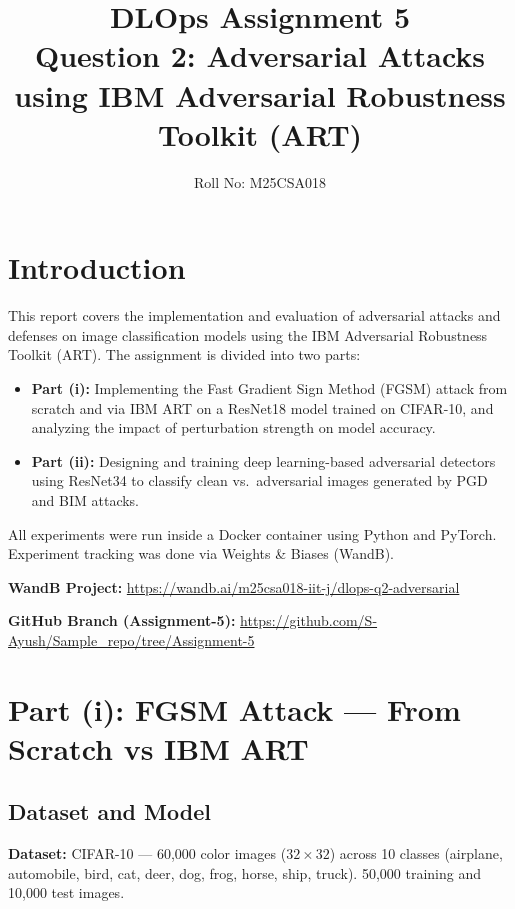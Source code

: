 \documentclass[12pt,a4paper]{article}
\title{
    \Large \textbf{DLOps Assignment 5} \\[0.5em]
    \large Question 2: Adversarial Attacks using IBM Adversarial Robustness Toolkit (ART)
}
\author{Roll No: M25CSA018}
\date{}
\begin{document}
\maketitle

\tableofcontents
\newpage

\section{Introduction}

This report covers the implementation and evaluation of adversarial attacks and
defenses on image classification models using the IBM Adversarial Robustness
Toolkit (ART). The assignment is divided into two parts:

\begin{itemize}
    \item \textbf{Part (i):} Implementing the Fast Gradient Sign Method (FGSM)
    attack from scratch and via IBM ART on a ResNet18 model trained on CIFAR-10,
    and analyzing the impact of perturbation strength on model accuracy.

    \item \textbf{Part (ii):} Designing and training deep learning-based
    adversarial detectors using ResNet34 to classify clean vs.\ adversarial
    images generated by PGD and BIM attacks.
\end{itemize}

All experiments were run inside a Docker container using Python and PyTorch.
Experiment tracking was done via Weights \& Biases (WandB).

\textbf{WandB Project:}
\url{https://wandb.ai/m25csa018-iit-j/dlops-q2-adversarial}

\textbf{GitHub Branch (Assignment-5):}
\url{https://github.com/S-Ayush/Sample_repo/tree/Assignment-5}

\section{Part (i): FGSM Attack — From Scratch vs IBM ART}

\subsection{Dataset and Model}

\textbf{Dataset:} CIFAR-10 — 60,000 color images ($32 \times 32$) across
10 classes (airplane, automobile, bird, cat, deer, dog, frog, horse, ship,
truck). 50,000 training and 10,000 test images.
\end{document}
